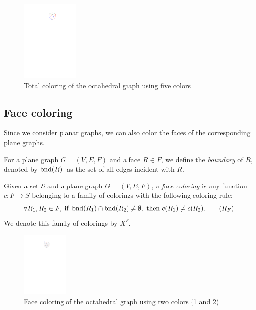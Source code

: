\begin{figure}[H]
    \centering
    \includegraphics[width=0.25\textwidth]{../Resources/Figs/octahedral_tot_colr.pdf}
    \caption{Total coloring of the octahedral graph using five colors}
    \label{fig:octahedral_tot_coloring}
\end{figure}

\subsection{Face coloring}

Since we consider planar graphs, we can also color the faces of the corresponding plane graphs.

\begin{defn}[boundary]
    For a plane graph $G=(V,E,F)$ and a face $R \in F$, we define the \emph{boundary} of $R$, denoted by $\operatorname{bnd}(R)$, as the set of all edges incident with $R$.
\end{defn}

\begin{defn}
    Given a set $S$ and a plane graph $G = (V, E, F)$, a \emph{face coloring} is any function $c : F \rightarrow S$ belonging to a family of colorings with the following coloring rule:
    \begin{equation}\label{eqn:face_rule}
     \forall R_1, R_2 \in F, \ \text{if } \operatorname{bnd}(R_1) \cap \operatorname{bnd}(R_2) \neq \emptyset, \text{ then } c(R_1) \neq c(R_2). \tag{$R_F$}
    \end{equation}
    We denote this family of colorings by $X^F$.
\end{defn}

\begin{figure}[H]
    \centering
    \includegraphics[width=0.2\textwidth]{../Resources/Figs/octahedral_face_colr.pdf}
    \caption{Face coloring of the octahedral graph using two colors (1 and 2)}
    \label{fig:face_tot_coloring}
\end{figure}

